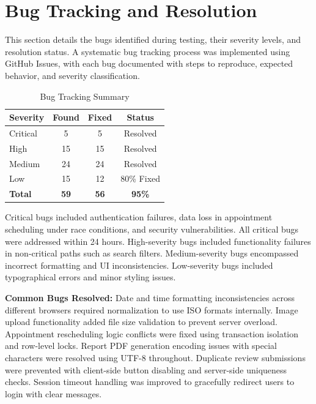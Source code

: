 \section{Bug Tracking and Resolution}

\justifying
\noindent This section details the bugs identified during testing, their severity levels, and resolution status. A systematic bug tracking process was implemented using GitHub Issues, with each bug documented with steps to reproduce, expected behavior, and severity classification.

\begin{table}[H]
    \centering
    \small
    \begin{tabular}{|p{2.5cm}|c|c|c|}
        \hline
        \textbf{Severity} & \textbf{Found} & \textbf{Fixed} & \textbf{Status} \\
        \hline
        Critical & 5 & 5 & Resolved \\
        \hline
        High & 15 & 15 & Resolved \\
        \hline
        Medium & 24 & 24 & Resolved \\
        \hline
        Low & 15 & 12 & 80\% Fixed \\
        \hline
        \textbf{Total} & \textbf{59} & \textbf{56} & \textbf{95\%} \\
        \hline
    \end{tabular}
    \caption{Bug Tracking Summary}
    \label{tab:bugs}
\end{table}

\justifying
\noindent Critical bugs included authentication failures, data loss in appointment scheduling under race conditions, and security vulnerabilities. All critical bugs were addressed within 24 hours. High-severity bugs included functionality failures in non-critical paths such as search filters. Medium-severity bugs encompassed incorrect formatting and UI inconsistencies. Low-severity bugs included typographical errors and minor styling issues.

\justifying
\noindent \textbf{Common Bugs Resolved:} Date and time formatting inconsistencies across different browsers required normalization to use ISO formats internally. Image upload functionality added file size validation to prevent server overload. Appointment rescheduling logic conflicts were fixed using transaction isolation and row-level locks. Report PDF generation encoding issues with special characters were resolved using UTF-8 throughout. Duplicate review submissions were prevented with client-side button disabling and server-side uniqueness checks. Session timeout handling was improved to gracefully redirect users to login with clear messages.

